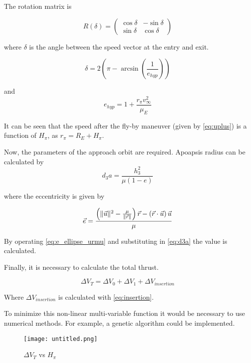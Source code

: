 The rotation matrix is

\begin{equation*}
R(\delta) = \left(
\begin{array}{cc}
\cos\delta & -\sin\delta \\
\sin\delta & \cos\delta
\end{array}
\right)
\end{equation*}

where $\delta$ is the angle between the speed vector at the entry and exit.

\begin{equation*}
\delta = 2\left(\pi - \arcsin\left(\frac{1}{e_{hyp}}\right)\right)
\end{equation*}

and 
\begin{equation*}
e_{hyp} = 1 + \frac{r_\pi v_\infty^2}{\mu_E}
\end{equation*}

It can be seen that the speed after the fly-by maneuver (given by \eqref{eq:uplus})  is a function of $H_\pi$, as $r_\pi = R_E + H_\pi$.

Now, the parameters of the approach orbit are required. Apoapsis radius can be calculated by
\begin{equation}\label{eq:d3a}
d_3a = \frac{h_3^2}{\mu(1-e)}
\end{equation}

where the eccentricity is given by

\begin{equation}\label{eq:e_ellipse_urmu}
\vec{e} = \frac{\left(\lVert\vec{u}\rVert^2 - \frac{\mu}{\lVert\vec{r}\rVert}\right) \vec{r} - \left(\vec{r}\cdot\vec{u}\right) \vec{u}}{\mu}
\end{equation}

By operating \eqref{eq:e_ellipse_urmu} and substituting in \eqref{eq:d3a} the value is calculated.

Finally, it is necessary to calculate the total thrust.

\begin{equation*}
\Delta V_T = \Delta V_0 + \Delta V_1 + \Delta V_{insertion}
\end{equation*}

Where $\Delta V_{insertion}$ is calculated with \eqref{eq:insertion}. 

To minimize this non-linear multi-variable function it would be necessary to use numerical methods. For example, a genetic algorithm could be implemented.

\begin{figure}[H]
	\centering
		\texttt{[image: untitled.png]}
	\caption{$\Delta V_T$ vs $H_\pi$}
	\label{fig:2b}
\end{figure}

